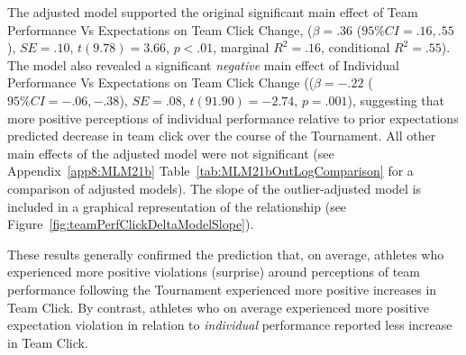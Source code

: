 \begin{CJK}{UTF8}{gbsn}


The adjusted model supported the original significant main effect of Team Performance Vs Expectations on Team Click Change, ($\beta = .36$ ($95\% CI =  .16, .55$), $SE = .10$, $t(9.78) = 3.66$, $p < .01$, marginal $R^2 = .16$, conditional $R^2 = .55$). The model also revealed a significant \textit{negative} main effect of Individual Performance Vs Expectations on Team Click Change (($\beta = -.22$ ($95\% CI =  -.06, -.38$), $SE = .08$, $t(91.90) = -2.74$, $p = .001$), suggesting that more positive perceptions of individual performance relative to prior expectations predicted decrease in team click over the course of the Tournament.
All other main effects of the adjusted model were not significant (see Appendix~\ref{app8:MLM21b} Table~\ref{tab:MLM21bOutLogComparison} for a comparison of adjusted models).  The slope of the outlier-adjusted model is included in a graphical representation of the relationship (see Figure~\ref{fig:teamPerfClickDeltaModelSlope}).

These results generally confirmed the prediction that, on average, athletes who experienced more positive violations (surprise) around perceptions of team performance following the Tournament experienced more positive increases in Team Click.  By contrast, athletes who on average experienced more positive expectation violation in relation to \textit{individual} performance reported less increase in Team Click.






\end{CJK}
